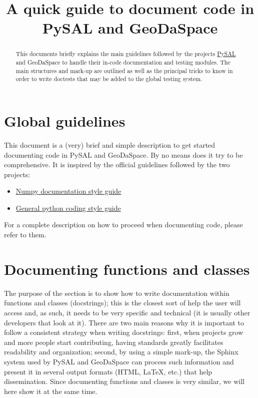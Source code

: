 \documentclass{article}
\title{A quick guide to document code in PySAL and GeoDaSpace}
\begin{document}
\maketitle

\begin{abstract}
    This documents briefly explains the main guidelines followed by the 
    projects \href{http://pysal.org}{PySAL} and GeoDaSpace to handle their
    in-code documentation and testing modules. The main structures and mark-up
    are outlined as well as the principal tricks to know in order to write doctests
    that may be added to the global testing system.
\end{abstract}

\tableofcontents

\newpage

\section{Global guidelines}
This document is a (very) brief and simple description to get started
documenting code in PySAL and GeoDaSpace. By no means does it try to be
comprehensive. It is inspired by the official guidelines followed by the two
projects:

\begin{itemize}
    \item \href{http://projects.scipy.org/numpy/wiki/CodingStyleGuidelines}{Numpy
        documentation style guide}
    \item \href{http://www.python.org/dev/peps/pep-0008/}{General python coding style guide}
\end{itemize}

For a complete description on how to proceed when documenting code, please
refer to them.

\section{Documenting functions and classes}
The purpose of the section is to show how to write documentation within
functions and classes (docstrings); this is the closest sort of help the user will access
and, as such, it needs to be very specific and technical (it is usually other
developers that look at it). There are two main reasons why it is important to
follow a consistent strategy when writing docstrings: first, when projects
grow and more people start contributing, having standards greatly facilitates
readability and organization; second, by using a simple mark-up, the Sphinx
system used by PySAL and GeoDaSpace can process such information and present
it in several output formats (HTML, \LaTeX, etc.) that help dissemination.
Since documenting functions and classes is very similar, we will here show it
at the same time.
\end{document}
